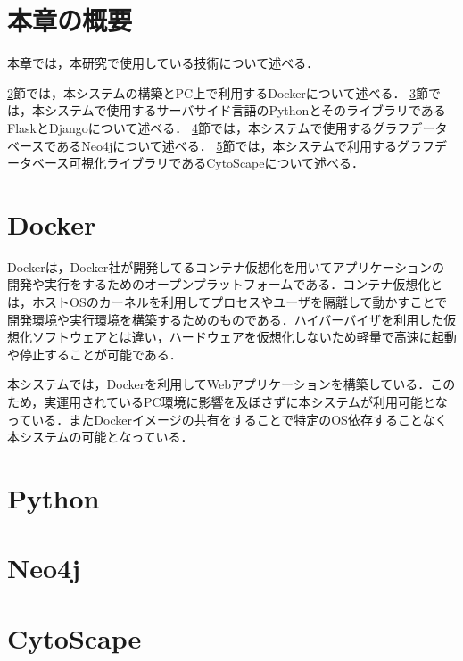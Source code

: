 \section{本章の概要}
本章では，本研究で使用している技術について述べる．

\ref{sec:docker}節では，本システムの構築とPC上で利用するDockerについて述べる．
\ref{sec:python}節では，本システムで使用するサーバサイド言語のPythonとそのライブラリであるFlaskとDjangoについて述べる．
\ref{sec:neo4j}節では，本システムで使用するグラフデータベースであるNeo4jについて述べる．
\ref{sec:cyto}節では，本システムで利用するグラフデータベース可視化ライブラリであるCytoScapeについて述べる．

\section{Docker}\label{sec:docker}
Docker\cite{docker}は，Docker社が開発してるコンテナ仮想化を用いてアプリケーションの開発や実行をするためのオープンプラットフォームである．コンテナ仮想化とは，ホストOSのカーネルを利用してプロセスやユーザを隔離して動かすことで開発環境や実行環境を構築するためのものである．ハイバーバイザを利用した仮想化ソフトウェアとは違い，ハードウェアを仮想化しないため軽量で高速に起動や停止することが可能である．

本システムでは，Dockerを利用してWebアプリケーションを構築している．このため，実運用されているPC環境に影響を及ぼさずに本システムが利用可能となっている．またDockerイメージの共有をすることで特定のOS依存することなく本システムの可能となっている．

\section{Python}\label{sec:python}

\section{Neo4j}\label{sec:neo4j}

\section{CytoScape}\label{sec:cyto}